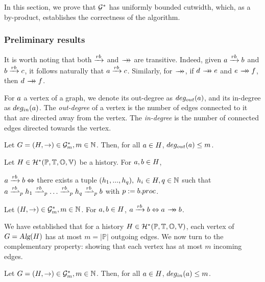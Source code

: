 In this section, we prove that $\mathcal{G}^*$ has uniformly bounded cutwidth, which, as a by-product, establishes the correctness of the algorithm.

\subsubsection{Preliminary results}


It is worth noting that both $\xrightarrow{rb}$ and $\patharrow$ are transitive. Indeed, given $a \xrightarrow{rb} b$ and $b \xrightarrow{rb} c$,   it follows naturally that $a\xrightarrow{rb}c$. Similarly, for  $\patharrow$, if $\opd \patharrow \ope$ and $\ope \patharrow \opf$, then $\opd \patharrow \opf$.

For $a$ a vertex of a graph, we denote its out-degree as $deg_{out}(a)$, and its in-degree as $deg_{in}(a)$. The \textsl{out-degree} of a vertex is the number of edges connected to it that are directed away from the vertex. The \textsl{in-degree} is the number of connected edges directed towards the vertex.

\begin{lemma}\label{lemma:degout}
Let $G=(H,\rightarrow)\in\mathcal{G}^*_m,m\in\mathbb{N}$. Then, for all $a\in H$, \mbox{$deg_{out}(a) \leq m$}.
\end{lemma}

\begin{proposition}\label{prop:finishesBeforeCollection}
Let $H\in\mathcal{H}^*(\mathbb{P}, \mathbb{T}, \mathbb{O}, \mathbb{V})$ be a history. For $a,b \in H$,
\begin{center}
$a\xrightarrow{rb}b \Leftrightarrow $ there exists a tuple $(h_1,...,h_q),\; h_i \in H, q\in\mathbb{N}$ such that 
$\opa \dsucp{p} \oph_1 \dsucp{p} \hdots \dsucp{p} \oph_q \dsucp{p} \opb$ with  $p:=b.proc$.
\end{center}
\end{proposition}

\begin{proposition}\label{prop:looparrowPATH}
Let $(H,\rightarrow)\in\mathcal{G}^*_m,m\in\mathbb{N}$. For \mbox{$a,b \in H$}, $\opa\rb\opb \Leftrightarrow \opa\patharrow\opb$.
\end{proposition}
We have established that for a history $H\in\mathcal{H}^*(\mathbb{P}, \mathbb{T}, \mathbb{O}, \mathbb{V})$, each vertex of $G=\textsl{Alg}(H)$ has at most $m=|\mathbb{P}|$ outgoing edges. We now turn to the complementary property: showing that each vertex has at most $m$ incoming edges.
\begin{lemma}\label{lemma:degin}
Let $G=(H,\rightarrow)\in\mathcal{G}^*_m,m\in\mathbb{N}$. Then, for all $a\in H$, \mbox{$deg_{in}(a) \leq m$}.
\end{lemma}

